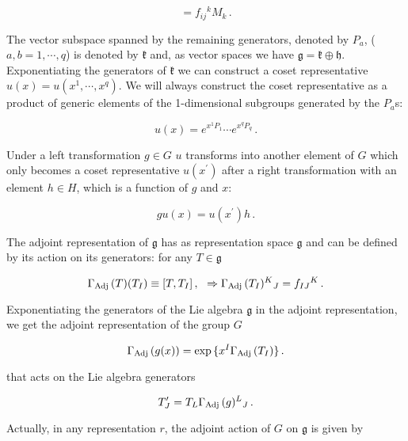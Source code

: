 \documentclass[12pt,a4paper]{article}
\begin{document}
\begin{equation}
[M_{i},M_{j}] = f_{ij}{}^{k}M_{k}\, .  
\end{equation}

The vector subspace spanned by the remaining generators, denoted by
$P_{a}$, ($a,b=1,\cdots,q$) is denoted by $\mathfrak{k}$ and, as vector
spaces we have $\mathfrak{g}=\mathfrak{k}\oplus\mathfrak{h}$.
Exponentiating the generators of $\mathfrak{k}$ we can construct a
coset representative $u(x)=u(x^{1},\cdots,x^{q})$. We will always
construct the coset representative as a product of generic elements of
the 1-dimensional subgroups generated by the $P_{a}$s:

\begin{equation}
\label{eq:cosetrepresentative}
u(x) =  e^{x^{1}P_{1}}\cdots  e^{x^{q}P_{q}}\, .  
\end{equation}

Under a left transformation $g\in G$ $u$ transforms into another
element of $G$ which only becomes a coset representative
$u(x^{\prime})$ after a right transformation with an element $h\in H$,
which is a function of $g$ and $x$:

\begin{equation}
gu(x) = u(x^{\prime}) h\, .  
\end{equation}

The adjoint representation of $\mathfrak{g}$ has as representation
space $\mathfrak{g}$ and can be defined by its action on its
generators: for any $T\in\mathfrak{g}$

\begin{equation}
\Gamma_{\rm Adj}\, (T) (T_{I})\equiv [T,T_{I}]\, ,
\,\,\,\, \Rightarrow 
\Gamma_{\rm Adj}\, (T_{I})^{K}{}_{J}= f_{IJ}{}^{K}\, .
\end{equation}

Exponentiating the generators of the Lie algebra $\mathfrak{g}$ in the
adjoint representation, we get the adjoint representation of the group
$G$

\begin{equation}
\Gamma_{\rm Adj}\,(g(x))
=\exp{\{x^{I}\Gamma_{\rm Adj}\,(T_{I})\}}  \, .
\end{equation}

\noindent that acts on the Lie algebra generators

\begin{equation}
T^{\prime}_{J} = T_{L}\Gamma_{\rm Adj}\,(g)^{L}{}_{J} \, .
\end{equation}

Actually, in any representation $r$, the adjoint action of $G$ on
$\mathfrak{g}$ is given by
\end{document}
